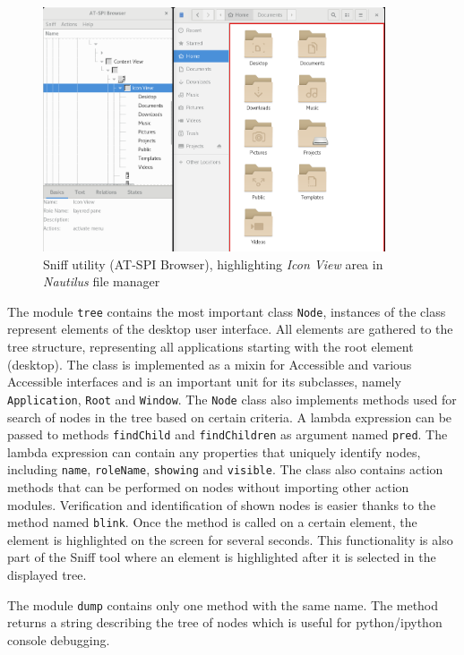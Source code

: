 \begin{figure}[h]
	\centering
	\includegraphics[width=0.9\textwidth]{obrazky-figures/sniff.png}
	\caption{Sniff utility (AT-SPI Browser), highlighting \textit{Icon View} area in \textit{Nautilus} file manager}
	\label{sniff}
\end{figure}

The module \texttt{tree} contains the most important class \texttt{Node}, instances of the class represent elements of the desktop user interface. All elements are gathered to the tree structure, representing all applications starting with the root element (desktop). The class is implemented as a mixin for Accessible and various Accessible interfaces and is an important unit for its subclasses, namely \texttt{Application}, \texttt{Root} and \texttt{Window}. The \texttt{Node} class also implements methods used for search of nodes in the tree based on certain criteria. A lambda expression can be passed to methods \texttt{findChild} and \texttt{findChildren} as argument named \texttt{pred}. The lambda expression can contain any properties that uniquely identify nodes, including \texttt{name}, \texttt{roleName},  \texttt{showing} and \texttt{visible}. The class also contains action methods that can be performed on nodes without importing other action modules. Verification and identification of shown nodes is easier thanks to the method named \texttt{blink}. Once the method is called on a certain element, the element is highlighted on the screen for several seconds. This functionality is also part of the Sniff tool where an element is highlighted after it is selected in the displayed tree.

The module \texttt{dump} contains only one method with the same name. The method returns a string describing the tree of nodes which is useful for python/ipython console debugging.

